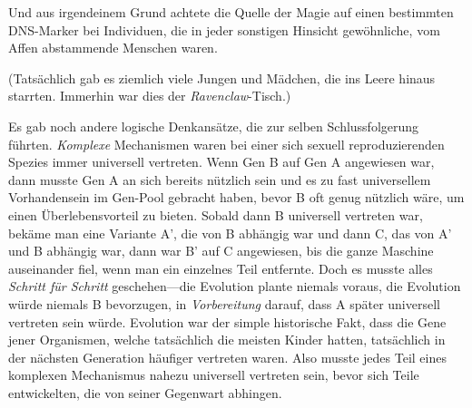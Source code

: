 Und aus irgendeinem Grund achtete die Quelle der Magie auf einen bestimmten DNS-Marker bei Individuen, die in jeder sonstigen Hinsicht gewöhnliche, vom Affen abstammende Menschen waren.

(Tatsächlich gab es ziemlich viele Jungen und Mädchen, die ins Leere hinaus starrten. Immerhin war dies der \emph{Ravenclaw}-Tisch.)

Es gab noch andere logische Denkansätze, die zur selben Schlussfolgerung führten. \emph{Komplexe} Mechanismen waren bei einer sich sexuell reproduzierenden Spezies immer universell vertreten. Wenn Gen B auf Gen A angewiesen war, dann musste Gen A an sich bereits nützlich sein und es zu fast universellem Vorhandensein im Gen-Pool gebracht haben, bevor B oft genug nützlich wäre, um einen Überlebensvorteil zu bieten. Sobald dann B universell vertreten war, bekäme man eine Variante A', die von B abhängig war und dann C, das von A' und B abhängig war, dann war B' auf C angewiesen, bis die ganze Maschine auseinander fiel, wenn man ein einzelnes Teil entfernte. Doch es musste alles \emph{Schritt für Schritt} geschehen—die Evolution plante niemals voraus, die Evolution würde niemals B bevorzugen, in \emph{Vorbereitung} darauf, dass A später universell vertreten sein würde. Evolution war der simple historische Fakt, dass die Gene jener Organismen, welche tatsächlich die meisten Kinder hatten, tatsächlich in der nächsten Generation häufiger vertreten waren. Also musste jedes Teil eines komplexen Mechanismus nahezu universell vertreten sein, bevor sich Teile entwickelten, die von seiner Gegenwart abhingen.

